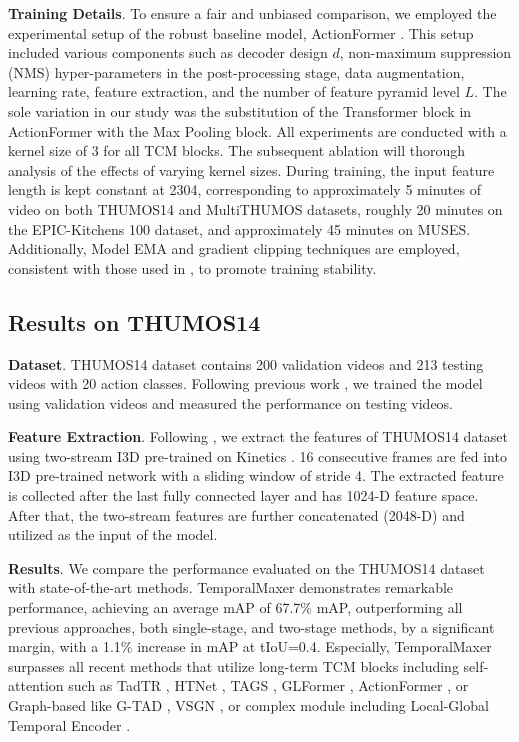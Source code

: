 \documentclass[10pt,twocolumn,letterpaper]{article}
\begin{document}
\textbf{Training Details}. To ensure a fair and unbiased comparison, we employed the experimental setup of the robust baseline model, ActionFormer \cite{zhang2022actionformer}. This setup included various components such as decoder design $d$, non-maximum suppression (NMS) hyper-parameters in the post-processing stage, data augmentation, learning rate, feature extraction, and the number of feature pyramid level $L$. The sole variation in our study was the substitution of the Transformer block in ActionFormer with the Max Pooling block. All experiments are conducted with a kernel size of 3 for all TCM blocks. The subsequent ablation  will thorough analysis of the effects of varying kernel sizes. During training, the input feature length is kept constant at 2304, corresponding to approximately 5 minutes of video on both THUMOS14 and MultiTHUMOS datasets, roughly 20 minutes on the EPIC-Kitchens 100 dataset, and approximately 45 minutes on MUSES. Additionally, Model EMA \cite{huang2017snapshot} and gradient clipping techniques are employed, consistent with those used in \cite{zhang2022actionformer}, to promote training stability.

\subsection{Results on THUMOS14}

\textbf{Dataset}. THUMOS14 dataset \cite{idrees2017thumos} contains 200 validation videos and 213 testing videos with 20 action classes. Following previous work \cite{lin2019bmn, lin2018bsn, xu2020g, zhao2020bottom, zhang2022actionformer}, we trained the model using validation videos and measured the performance on testing videos.

\textbf{Feature Extraction}. Following \cite{zhang2022actionformer, zhao2020bottom}, we extract the features of THUMOS14 dataset using two-stream I3D \cite{carreira2017quo} pre-trained on Kinetics \cite{kay2017kinetics}. 16 consecutive frames are fed into I3D pre-trained network with a sliding window of stride 4. The extracted feature is collected after the last fully connected layer and has 1024-D feature space. After that, the two-stream features are further concatenated (2048-D) and utilized as the input of the model.

\textbf{Results}. We compare the performance
evaluated on the THUMOS14 dataset \cite{idrees2017thumos} with state-of-the-art methods. TemporalMaxer demonstrates remarkable performance, achieving an average mAP of 67.7\% mAP, outperforming all previous approaches, both single-stage, and two-stage methods, by a significant margin, with a 1.1\% increase in mAP at tIoU=0.4.
Especially, TemporalMaxer surpasses all recent methods that utilize long-term TCM blocks including self-attention such as TadTR \cite{liu2022end}, HTNet \cite{kang2022htnet}, TAGS \cite{nag2022proposal}, GLFormer \cite{he2022glformer}, ActionFormer \cite{zhang2022actionformer}, or Graph-based like G-TAD \cite{xu2020g}, VSGN \cite{zhao2021video}, or complex module including Local-Global Temporal Encoder \cite{qing2021temporal}.
\end{document}
